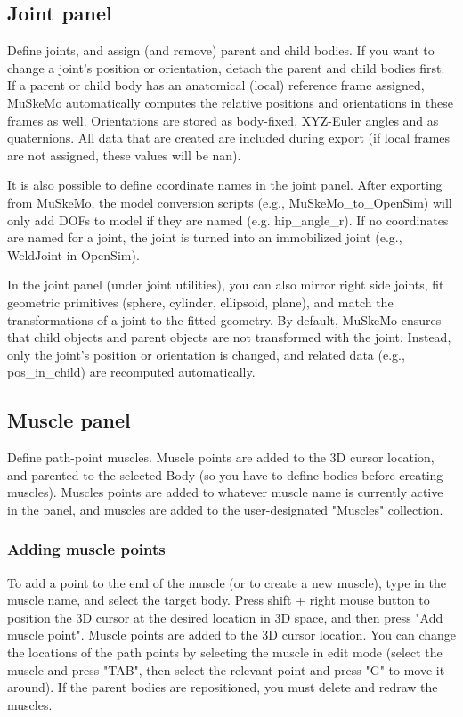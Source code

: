 \documentclass{article}
\begin{document}
\subsection{Joint panel}

Define joints, and assign (and remove) parent and child bodies. If you want to change a joint's position or orientation, detach the parent and child bodies first. If a parent or child body has an anatomical (local) reference frame assigned, MuSkeMo automatically computes the relative positions and orientations in these frames as well. Orientations are stored as body-fixed, XYZ-Euler angles and as quaternions. All data that are created are included during export (if local frames are not assigned, these values will be nan).

It is also possible to define coordinate names in the joint panel. After exporting from MuSkeMo, the model conversion scripts (e.g., MuSkeMo\_to\_OpenSim) will only add DOFs to model if they are named (e.g. hip\_angle\_r). If no coordinates are named for a joint, the joint is turned into an immobilized joint (e.g., WeldJoint in OpenSim). 

In the joint panel (under joint utilities), you can also mirror right side joints, fit geometric primitives (sphere, cylinder, ellipsoid, plane), and match the transformations of a joint to the fitted geometry. By default, MuSkeMo ensures that child objects and parent objects are not transformed with the joint. Instead, only the joint's position or orientation is changed, and related data (e.g., pos\_in\_child) are recomputed automatically.

\subsection{Muscle panel}

Define path-point muscles. Muscle points are added to the 3D cursor location, and parented to the selected Body (so you have to define bodies before creating muscles). Muscles points are added to whatever muscle name is currently active in the panel, and muscles are added to the user-designated "Muscles" collection.

\subsubsection{Adding muscle points}

To add a point to the end of the muscle (or to create a new muscle), type in the muscle name, and select the target body. Press shift + right mouse button to position the 3D cursor at the desired location in 3D space, and then press "Add muscle point". Muscle points are added to the 3D cursor location.
You can change the locations of the path points by selecting the muscle in edit mode (select the muscle and press "TAB", then select the relevant point and press "G" to move it around). If the parent bodies are repositioned, you must delete and redraw the muscles.
\end{document}
